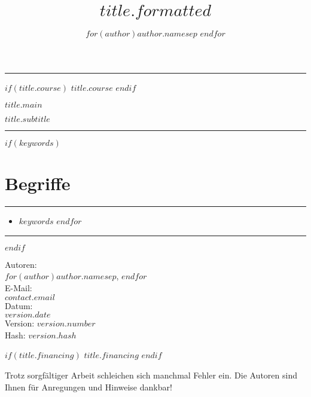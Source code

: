 \documentclass[12pt,a4paper, twoside=false]{scrartcl}
\author{
$for(author)$$author.name$$sep$ \And $endfor$
}
\title{$title.formatted$}
\providecommand{\Keywords}{%
\section*{Begriffe}%
\begin{minipage}{\textwidth}%
\hrule%
\begin{multicols}{3}%
\begin{itemize}[leftmargin=0mm]%
$for(keywords)$\item[] $keywords$ $endfor$
\end{itemize}%
\end{multicols}%
\vspace{-2mm}%
\hrule%
\end{minipage}%
\needspace{.25\textheight}%
}
\begin{document}
\begin{titlepage}


\par
{}%
\hfill
\par

\begin{center}

\noindent\rule{\textwidth}{0.4pt}


$if(title.course)$
\vspace{0.5 cm} {\large \textsf{$title.course$}}
$endif$


\vspace{0.5 cm} {\LARGE \textbf{ \textsf{$title.main$}}\par}
\vspace{0.5 cm} {\Large \textsf{$title.subtitle$}}


\noindent\rule{\textwidth}{0.4pt}
\setcounter{tocdepth}{3}
\tableofcontents


$if(keywords)$
\Keywords
$endif$

\end{center}


 \begin{center}
  	\vspace{1 cm}Autoren: \\ \vspace{2 mm}$for(author)$$author.name$$sep$, $endfor$ \\
  	\vspace{0.5cm}E-Mail: \\ \vspace{2 mm} $contact.email$ \\
   	\vspace{0.5 cm}Datum: \\ \vspace{2 mm} $version.date$ \\
   	\vspace{0.5 cm}  Version: $version.number$\\
   	\vspace{2 mm}  Hash: $version.hash$

$if(title.financing)$
	\vspace{0.5 cm}  $title.financing$
$endif$

	\vspace{0.5 cm}
    Trotz sorgfältiger Arbeit schleichen sich manchmal Fehler ein. Die Autoren sind Ihnen für Anregungen und Hinweise dankbar!\\
    \vfill
   	\end{center}


\end{titlepage}
\end{document}
